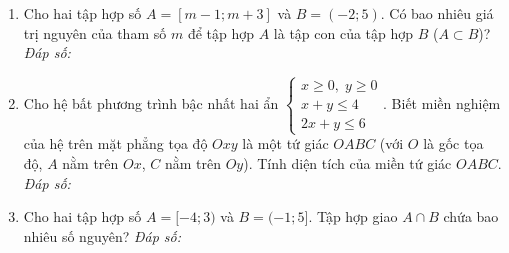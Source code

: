 \documentclass[12pt,a4paper]{article}
\newcommand{\answerbox}{\hfill\textit{Đáp số:}\ \fbox{\rule{0pt}{11pt}\hspace{2.2cm}}}
\begin{document}
\begin{enumerate}[resume]
\item Cho hai tập hợp số $A = [m - 1; m + 3]$ và $B = (-2; 5)$. Có bao nhiêu giá trị nguyên của tham số $m$ để tập hợp $A$ là tập con của tập hợp $B$ ($A \subset B$)?
\answerbox

\item Cho hệ bất phương trình bậc nhất hai ẩn $\begin{cases} x \ge 0,\; y \ge 0 \\ x + y \le 4 \\ 2x + y \le 6 \end{cases}$. Biết miền nghiệm của hệ trên mặt phẳng tọa độ $Oxy$ là một tứ giác $OABC$ (với $O$ là gốc tọa độ, $A$ nằm trên $Ox$, $C$ nằm trên $Oy$). Tính diện tích của miền tứ giác $OABC$.
\answerbox

\item Cho hai tập hợp số $A = [-4; 3)$ và $B = (-1; 5]$. Tập hợp giao $A \cap B$ chứa bao nhiêu số nguyên?
\answerbox
\end{enumerate}
\end{document}
